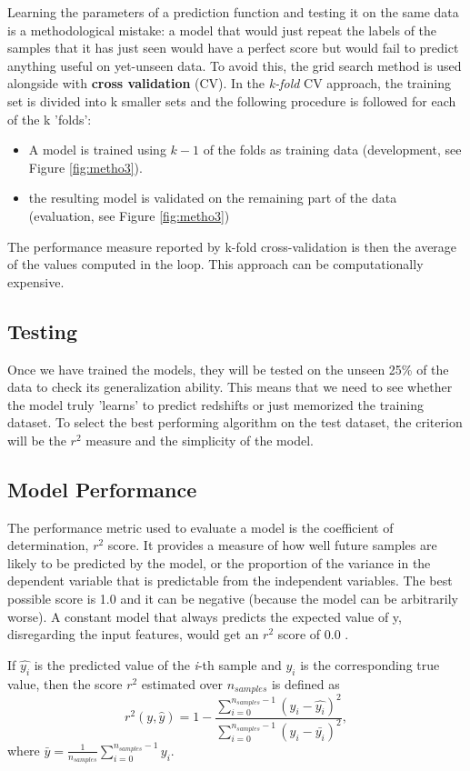 Learning the parameters of a prediction function and testing it on the same data is a methodological mistake: a model that would just repeat the labels of the samples that it has just seen would have a perfect score but would fail to predict anything useful on yet-unseen data. To avoid this, the grid search method is used alongside with \textbf{cross validation} (CV). In the \textit{k-fold} CV approach, the training set is divided into k smaller sets and the following procedure is followed for each of the k 'folds':
\begin{itemize}
	\item A model is trained using $k -1$ of the folds as training data (development, see Figure \ref{fig:metho3}).
	\item the resulting model is validated on the remaining part of the data (evaluation, see Figure \ref{fig:metho3})
\end{itemize}
The performance measure reported by k-fold cross-validation is then the average of the values computed in the loop. This approach can be computationally expensive.

\subsection{Testing}
Once we have trained the models, they will be tested on the unseen 25\% of the data to check its generalization ability. This means that we need to see whether the model truly 'learns' to predict redshifts or just memorized the training dataset. To select the best performing algorithm on the test dataset, the criterion will be the $r^2$ measure and the simplicity of the model.
\subsection{Model Performance}
The performance metric used to evaluate a model is the coefficient of determination, $r^2$ score. It provides a measure of how well future samples are likely to be predicted by the model, or the proportion of the variance in the dependent variable that is predictable from the independent variables. The best possible score is 1.0 and it can be negative (because the model can be arbitrarily worse). A constant model that always predicts the expected value of y, disregarding the input features, would get an $r^2$ score of 0.0 \cite{krr}.

If $\hat{y_i}$ is the predicted value of the \textit{i}-th sample and $y_i$ is the corresponding true value, then the score $r^2$ estimated over $n_{samples}$ is defined as 
\begin{equation}
r^2 (y, \hat{y}) = 1 - \frac{\sum_{i = 0}^{n_{samples} - 1} \left(y_i - \hat{y_i}\right)^2}{\sum_{i = 0}^{n_{samples} - 1} \left(y_i - \bar{y_i}\right)^2},
\end{equation} 
where $\bar{y} = \frac{1}{n_{samples}}\sum_{i = 0}^{n_{samples} - 1} y_i$. 

